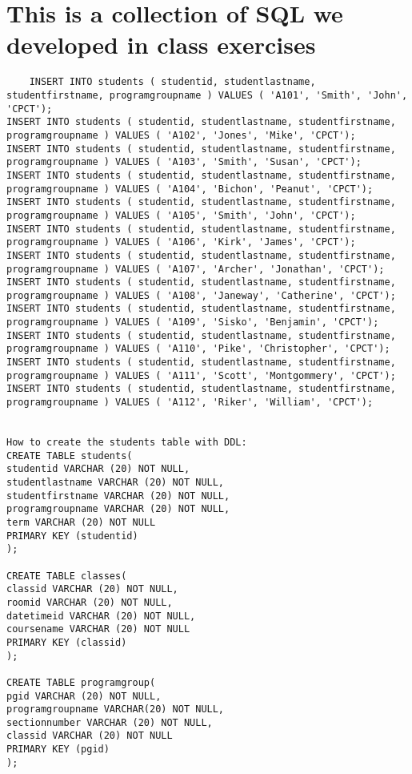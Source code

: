 \newpage
\section {This is a collection of SQL we developed in class exercises}

\begin{lstlisting}
    INSERT INTO students ( studentid, studentlastname, studentfirstname, programgroupname ) VALUES ( 'A101', 'Smith', 'John', 'CPCT');
INSERT INTO students ( studentid, studentlastname, studentfirstname, programgroupname ) VALUES ( 'A102', 'Jones', 'Mike', 'CPCT');
INSERT INTO students ( studentid, studentlastname, studentfirstname, programgroupname ) VALUES ( 'A103', 'Smith', 'Susan', 'CPCT');
INSERT INTO students ( studentid, studentlastname, studentfirstname, programgroupname ) VALUES ( 'A104', 'Bichon', 'Peanut', 'CPCT');
INSERT INTO students ( studentid, studentlastname, studentfirstname, programgroupname ) VALUES ( 'A105', 'Smith', 'John', 'CPCT');
INSERT INTO students ( studentid, studentlastname, studentfirstname, programgroupname ) VALUES ( 'A106', 'Kirk', 'James', 'CPCT');
INSERT INTO students ( studentid, studentlastname, studentfirstname, programgroupname ) VALUES ( 'A107', 'Archer', 'Jonathan', 'CPCT');
INSERT INTO students ( studentid, studentlastname, studentfirstname, programgroupname ) VALUES ( 'A108', 'Janeway', 'Catherine', 'CPCT');
INSERT INTO students ( studentid, studentlastname, studentfirstname, programgroupname ) VALUES ( 'A109', 'Sisko', 'Benjamin', 'CPCT');
INSERT INTO students ( studentid, studentlastname, studentfirstname, programgroupname ) VALUES ( 'A110', 'Pike', 'Christopher', 'CPCT');
INSERT INTO students ( studentid, studentlastname, studentfirstname, programgroupname ) VALUES ( 'A111', 'Scott', 'Montgommery', 'CPCT');
INSERT INTO students ( studentid, studentlastname, studentfirstname, programgroupname ) VALUES ( 'A112', 'Riker', 'William', 'CPCT');


How to create the students table with DDL:
CREATE TABLE students(
studentid VARCHAR (20) NOT NULL,
studentlastname VARCHAR (20) NOT NULL,
studentfirstname VARCHAR (20) NOT NULL,
programgroupname VARCHAR (20) NOT NULL,
term VARCHAR (20) NOT NULL
PRIMARY KEY (studentid)
);

CREATE TABLE classes(
classid VARCHAR (20) NOT NULL,
roomid VARCHAR (20) NOT NULL,
datetimeid VARCHAR (20) NOT NULL,
coursename VARCHAR (20) NOT NULL
PRIMARY KEY (classid)
);

CREATE TABLE programgroup(
pgid VARCHAR (20) NOT NULL,
programgroupname VARCHAR(20) NOT NULL,
sectionnumber VARCHAR (20) NOT NULL,
classid VARCHAR (20) NOT NULL
PRIMARY KEY (pgid)
);


\end{lstlisting}

